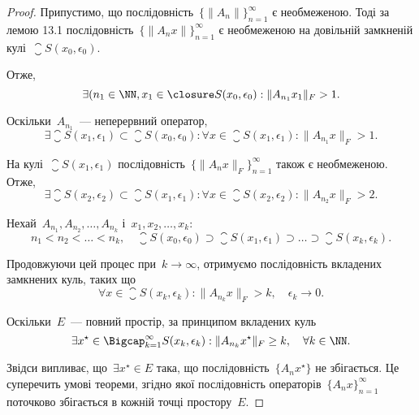 \begin{proof}
Припустимо, що послідовність~$\{\|A_n\|\}_{n = 1}^\infty$ є необмеженою.
Тоді за лемою 13.1 послідовність~$\{\|A_n x\|\}_{n = 1}^\infty$
є необмеженою на довільній замкненій кулі~$\closure S(x_0, \epsilon_0)$.

Отже, 
\begin{equation*}
    \exists (n_1 \in \NN, x_1 \in \closure S(x_0, \epsilon_0): \|A_{n_1} x_1\|_F > 1.    
\end{equation*}

Оскільки~$A_{n_1}$~--- неперервний оператор,
\begin{equation*}
    \exists \closure S(x_1, \epsilon_1) \subset \closure S(x_0, \epsilon_0):
    \forall x \in \closure S(x_1, \epsilon_1): \|A_{n_1} x\|_F > 1.
\end{equation*}

На кулі~$\closure S(x_1, \epsilon_1)$ послідовність~$\{\|A_n x\|_F\}_{n = 1}^\infty$
також є необмеженою. Отже,
\begin{equation*}
    \exists \closure S(x_2, \epsilon_2) \subset \closure S(x_1, \epsilon_1):
    \forall x \in \closure S(x_2, \epsilon_2): \|A_{n_2} x\|_F > 2.
\end{equation*}

Нехай~$A_{n_1}, A_{n_2}, \dots, A_{n_k}$ і~$x_1, x_2, \dots, x_k$:
\begin{equation*}
    n_1 < n_2 < \dots < n_k, \quad
    \closure S(x_0, \epsilon_0) \supset 
    \closure S(x_1, \epsilon_1) \supset
    \dots \supset \closure S(x_k, \epsilon_k).
\end{equation*}

Продовжуючи цей процес при~$k \to \infty$, отримуємо
послідовність вкладених замкнених куль, таких що
\begin{equation*}
    \forall x \in \closure S(x_k, \epsilon_k): \|A_{n_k} x\|_F > k, \quad \epsilon_k \to 0.
\end{equation*}

Оскільки~$E$~--- повний простір, за принципом вкладених куль
\begin{equation*}
    \exists x^\star \in \Bigcap_{k = 1}^\infty S(x_k, \epsilon_k):
    \|A_{n_k} x^\star\|_F \ge k, \quad \forall k \in \NN.
\end{equation*}

Звідси випливає, що~$\exists x^\star \in E$ така, що послідовність~$\{A_n x^\star\}$
не збігається. Це суперечить умові теореми, згідно якої
послідовність операторів~$\{A_n x\}_{n = 1}^\infty$
поточково збігається в кожній точці простору~$E$.


\end{proof}
